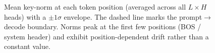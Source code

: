 \begin{figure}[h]
  \centering
  \caption{Mean key-norm at each token position (averaged across all
  $L\times H$ heads) with a $\pm 1\sigma$ envelope. The dashed line marks
  the prompt$\rightarrow$decode boundary. Norms peak at the first few
  positions (BOS / system header) and exhibit position-dependent drift
  rather than a constant value.}
  \label{fig:keynorm-pos}
\end{figure}

